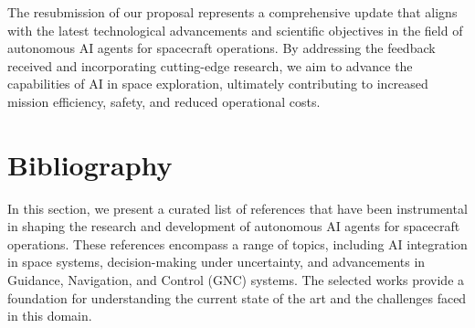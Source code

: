 \documentclass[a4paper, 11pt]{article}
\begin{document}
The resubmission of our proposal represents a comprehensive update that aligns with the latest technological advancements and scientific objectives in the field of autonomous AI agents for spacecraft operations. By addressing the feedback received and incorporating cutting-edge research, we aim to advance the capabilities of AI in space exploration, ultimately contributing to increased mission efficiency, safety, and reduced operational costs.
\section{Bibliography}

In this section, we present a curated list of references that have been instrumental in shaping the research and development of autonomous AI agents for spacecraft operations. These references encompass a range of topics, including AI integration in space systems, decision-making under uncertainty, and advancements in Guidance, Navigation, and Control (GNC) systems. The selected works provide a foundation for understanding the current state of the art and the challenges faced in this domain.
\end{document}
